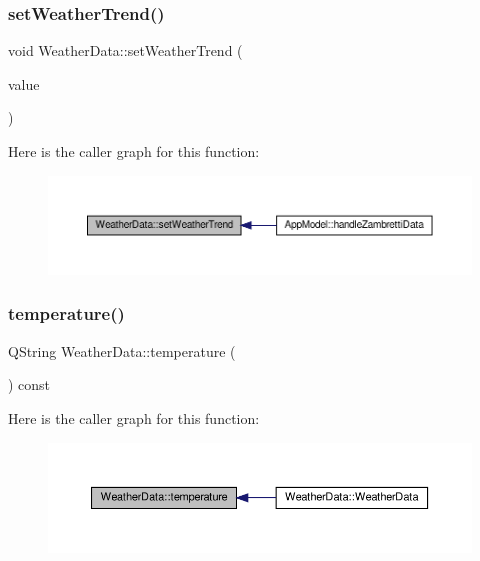 \subsubsection{\texorpdfstring{set\+Weather\+Trend()}{setWeatherTrend()}}
{\footnotesize\ttfamily void Weather\+Data\+::set\+Weather\+Trend (\begin{DoxyParamCaption}\item[{const Q\+String \&}]{value }\end{DoxyParamCaption})}

Here is the caller graph for this function\+:\nopagebreak
\begin{figure}[H]
\begin{center}
\leavevmode
\includegraphics[width=350pt]{class_weather_data_afeefe6463c52698e2fc4c010d8d35dc2_icgraph}
\end{center}
\end{figure}
\mbox{\label{class_weather_data_a5a193e8410e3a146de59bab224cd88f0}} 
\subsubsection{\texorpdfstring{temperature()}{temperature()}}
{\footnotesize\ttfamily Q\+String Weather\+Data\+::temperature (\begin{DoxyParamCaption}{ }\end{DoxyParamCaption}) const}

Here is the caller graph for this function\+:\nopagebreak
\begin{figure}[H]
\begin{center}
\leavevmode
\includegraphics[width=350pt]{class_weather_data_a5a193e8410e3a146de59bab224cd88f0_icgraph}
\end{center}
\end{figure}
\mbox{\label{class_weather_data_a63a3528697c8681bd32d4d170ec91f76}} 
